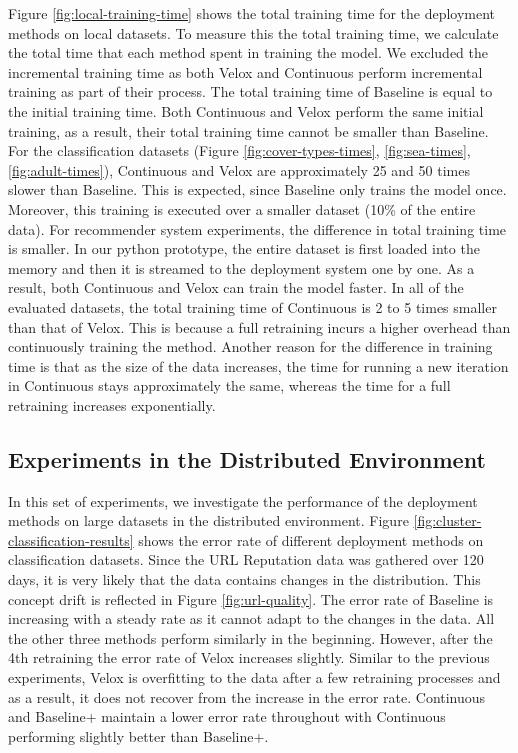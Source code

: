 \documentclass{vldb}
\begin{document}
Figure \ref{fig:local-training-time} shows the total training time for the deployment methods on local datasets.
To measure this the total training time, we calculate the total time that each method spent in training the model.
We excluded the incremental training time as both Velox and Continuous perform incremental training as part of their process.
The total training time of Baseline is equal to the initial training time.
Both Continuous and Velox perform the same initial training, as a result, their total training time cannot be smaller than Baseline.
For the classification datasets (Figure \ref{fig:cover-types-times}, \ref{fig:sea-times}, \ref{fig:adult-times}), Continuous and Velox are approximately 25 and 50 times slower than Baseline.
This is expected, since Baseline only trains the model once.
Moreover, this training is executed over a smaller dataset (10\% of the entire data).
For recommender system experiments, the difference in total training time is smaller.
In our python prototype, the entire dataset is first loaded into the memory and then it is streamed to the deployment system one by one.
As a result, both Continuous and Velox can train the model faster.
In all of the evaluated datasets, the total training time of Continuous is 2 to 5 times smaller than that of Velox.
This is because a full retraining incurs a higher overhead than continuously training the method.
Another reason for the difference in training time is that as the size of the data increases, the time for running a new iteration in Continuous stays approximately the same, whereas the time for a full retraining increases exponentially.

\subsection{Experiments in the Distributed Environment}
In this set of experiments, we investigate the performance of the deployment methods on large datasets in the distributed environment.
Figure \ref{fig:cluster-classification-results} shows the error rate of different deployment methods on classification datasets.
Since the URL Reputation data was gathered over 120 days, it is very likely that the data contains changes in the distribution.
This concept drift is reflected in Figure \ref{fig:url-quality}.
The error rate of Baseline is increasing with a steady rate as it cannot adapt to the changes in the data.
All the other three methods perform similarly in the beginning.
However, after the 4th retraining the error rate of Velox increases slightly.
Similar to the previous experiments, Velox is overfitting to the data after a few retraining processes and as a result, it does not recover from the increase in the error rate.
Continuous and Baseline+ maintain a lower error rate throughout with Continuous performing slightly better than Baseline+.
\end{document}
